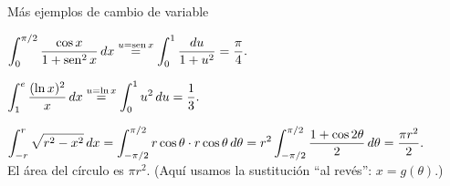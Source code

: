 \documentclass[10pt,aspectratio=169]{beamer}
\begin{document}
\begin{frame}{Más ejemplos de cambio de variable}
  \begin{ejemplo}[2]
    $\displaystyle\int_0^{\pi/2}\frac{\cos x}{1+\operatorname{sen}^2x}\,dx\overset{u=\operatorname{sen} x}{=}\int_0^1\frac{du}{1+u^2}=\frac\pi4.$
  \end{ejemplo}
  \begin{ejemplo}[3]
    $\displaystyle\int_1^{e}\frac{(\ln x)^2}{x}\,dx\overset{u=\ln x}{=}\int_0^1u^2\,du=\frac13.$
  \end{ejemplo}
  \begin{ejemplo}[4: área de un círculo, $x=r\sen\theta$]
    $\displaystyle\int_{-r}^r\sqrt{r^2-x^2}\,dx=\int_{-\pi/2}^{\pi/2}r\cos\theta\cdot r\cos\theta\,d\theta
    =r^2\int_{-\pi/2}^{\pi/2}\frac{1+\cos2\theta}{2}\,d\theta=\frac{\pi r^2}{2}.$\\
    El área del círculo es $\pi r^2$. (Aquí usamos la sustitución ``al revés'': $x=g(\theta)$.)
  \end{ejemplo}
\end{frame}
\end{document}

